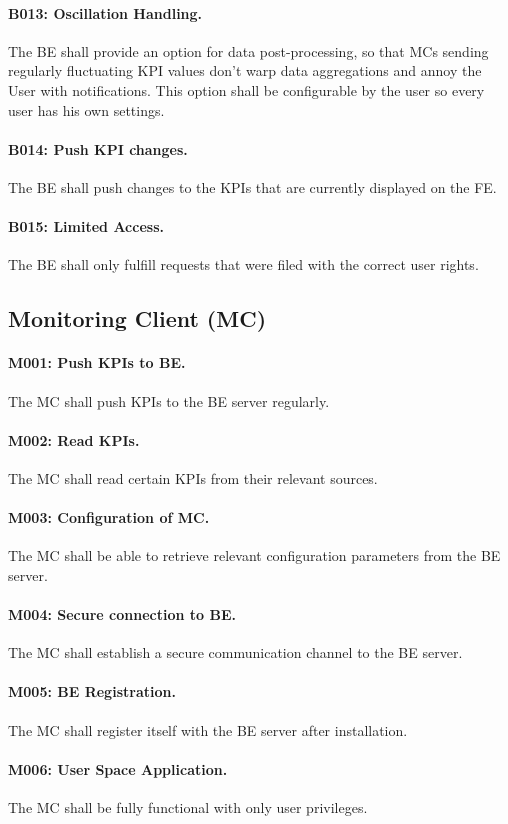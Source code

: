 \documentclass{scrreprt}
\begin{document}
\paragraph{B013: Oscillation Handling.} The BE shall provide an option for data post-processing, so that MCs sending regularly fluctuating KPI values don't warp data aggregations and annoy the User with notifications. This option shall be configurable by the user so every user has his own settings.
\paragraph{B014: Push KPI changes.} The BE shall push changes to the KPIs that are currently displayed on the FE.
\paragraph{B015: Limited Access.} The BE shall only fulfill requests that were filed with the correct user rights.

\subsection{Monitoring Client (MC)}
\paragraph{M001: Push KPIs to BE.} The MC shall push KPIs to the BE server regularly.
\paragraph{M002: Read KPIs.} The MC shall read certain KPIs from their relevant sources.
\paragraph{M003: Configuration of MC.} The MC shall be able to retrieve relevant configuration parameters from the BE server.
\paragraph{M004: Secure connection to BE.} The MC shall establish a secure communication channel to the BE server.
\paragraph{M005: BE Registration.} The MC shall register itself with the BE server after installation.
\paragraph{M006: User Space Application.} The MC shall be fully functional with only user privileges.
\end{document}
